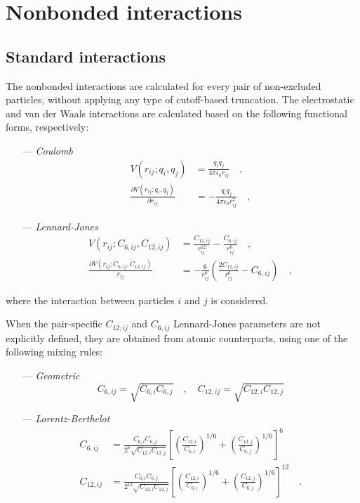 \documentclass[10pt,a4paper]{report}
\numberwithin{equation}{section}
\begin{document}
\section{Nonbonded interactions}
\label{sec:nonbonded}

\subsection{Standard interactions}
\label{sec:standard-lj-interactions}

The nonbonded interactions are calculated for every pair of
non-excluded particles, without applying any type of cutoff-based
truncation.  The electrostatic and van der Waals interactions are
calculated based on the following functional forms, respectively:\cite{GROMOS-doc,GROMACS-doc}

\begin{itemize}
\item[---] \textit{Coulomb}
  \begin{align}
  \label{eq:coulomb-term}
    V(r_{ij};q_i,q_j) & = \frac{q_i q_j}{4\pi\epsilon_0 r_{ij}} \quad , \\ \nonumber
    \frac{\partial V(r_{ij};q_i,q_j)}{\partial r_{ij}} & = -\frac{q_i q_j}{4 \pi \epsilon_0 r_{ij}^2} \quad ,
\end{align}
\item[---] \textit{Lennard-Jones}
    \begin{align}
  \label{eq:lj-term}
      V(r_{ij};C_{6,ij},C_{12,ij}) & = \frac{C_{12,ij}}{r_{ij}^{12}} - \frac{C_{6,ij}}{r_{ij}^6} \quad , \\ \nonumber
      \frac{\partial V(r_{ij};C_{6,ij},C_{12,ij})}{r_{ij}} & = -\frac{6}{r_{ij}^8}\left(\frac{2C_{12,ij}}{r_{ij}^{6}} - C_{6,ij} \right) \quad ,
\end{align}
\end{itemize}
where the interaction between particles $i$ and $j$ is considered.

When the pair-specific $C_{12,ij}$ and
$C_{6,ij}$ Lennard-Jones parameters are not explicitly defined,
they are obtained from atomic
counterparts, using one of the following mixing rules:
\begin{itemize}
\item [---] \textit{Geometric}
  \begin{equation}
    \label{eq:geometric-mix}
    C_{6,ij} = \sqrt{C_{6,i}C_{6,j}} \quad , \quad C_{12,ij} = \sqrt{C_{12,i}C_{12,j}}
  \end{equation}
\item [---]\textit{Lorentz-Berthelot}
  \begin{align}
    \label{eq:lorentz-mix}
    C_{6,ij} &= \frac{C_{6,i}C_{6,j}}{2^6 \sqrt{C_{12,i}C_{12,j}}}\left[\left(\frac{C_{12,i}}{C_{6,i}}\right)^{1/6} + \left(\frac{C_{12,j}}{C_{6,j}}\right)^{1/6} \right]^6  \\ \nonumber
    C_{12,ij} &= \frac{C_{6,i}C_{6,j}}{2^{12} \sqrt{C_{12,i}C_{12,j}}}\left[\left(\frac{C_{12,i}}{C_{6,i}}\right)^{1/6} + \left(\frac{C_{12,j}}{C_{6,j}}\right)^{1/6} \right]^{12} \quad .
  \end{align}
\end{itemize}
\end{document}
